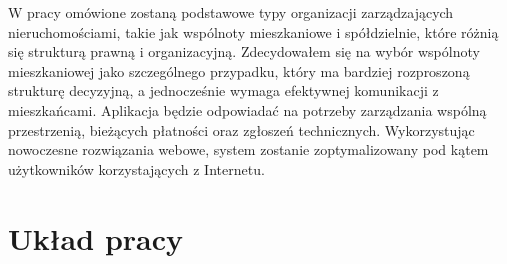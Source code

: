 W pracy omówione zostaną podstawowe typy organizacji zarządzających nieruchomościami, takie jak wspólnoty mieszkaniowe i spółdzielnie, które różnią się strukturą prawną i organizacyjną. Zdecydowałem się na wybór wspólnoty mieszkaniowej jako szczególnego przypadku, który ma bardziej rozproszoną strukturę decyzyjną, a jednocześnie wymaga efektywnej komunikacji z mieszkańcami. Aplikacja będzie odpowiadać na potrzeby zarządzania wspólną przestrzenią, bieżących płatności oraz zgłoszeń technicznych. Wykorzystując nowoczesne rozwiązania webowe, system zostanie zoptymalizowany pod kątem użytkowników korzystających z Internetu.


\section{Układ pracy}
